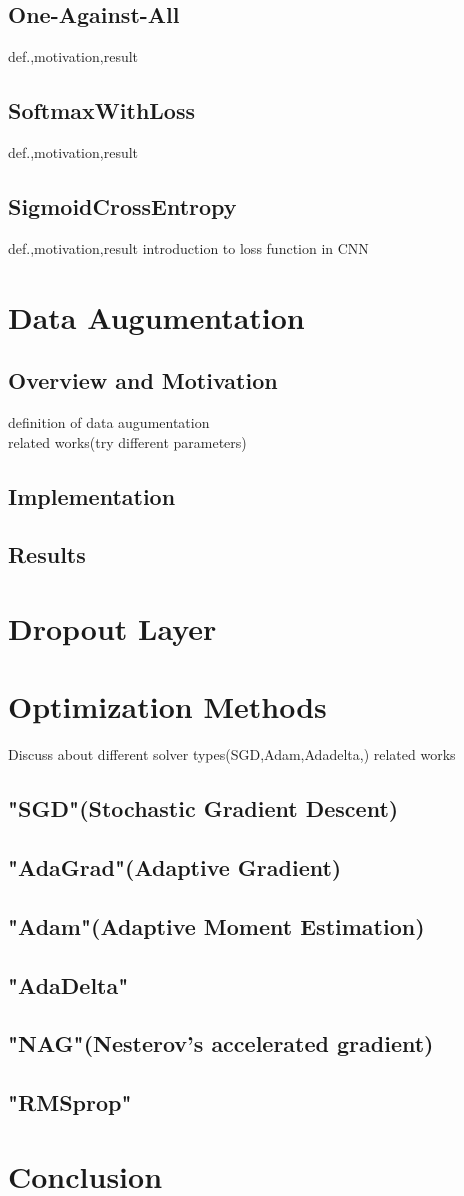 \documentclass[11pt,a4paper]{article}
\begin{document}
\subsection{One-Against-All}
def.,motivation,result
\subsection{SoftmaxWithLoss}
def.,motivation,result
\subsection{SigmoidCrossEntropy}
def.,motivation,result
introduction to loss function in CNN

\section{Data Augumentation}
\subsection{Overview and Motivation}
definition of data augumentation\\
related works(try different parameters)
\subsection{Implementation}
\subsection{Results}

\section{Dropout Layer}

\section{Optimization Methods}
Discuss about different solver types(SGD,Adam,Adadelta,) related works
\subsection{"SGD"(Stochastic Gradient Descent)}
\subsection{"AdaGrad"(Adaptive Gradient)}
\subsection{"Adam"(Adaptive Moment Estimation)}
\subsection{"AdaDelta"}
\subsection{"NAG"(Nesterov’s accelerated gradient)}
\subsection{"RMSprop"}

\section{Conclusion}

\appendix
\end{document}
